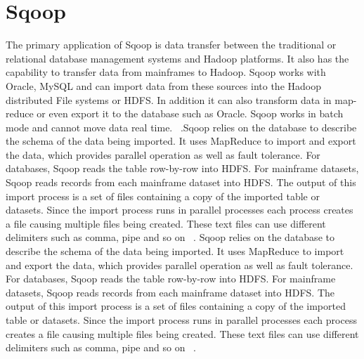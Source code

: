 \section{Sqoop}

The primary application of Sqoop is data transfer between the 
traditional or relational database management systems and 
Hadoop platforms. It also has the capability to transfer data 
from mainframes to Hadoop. Sqoop works with Oracle, MySQL and
can import data from these sources into the Hadoop distributed 
File systems or HDFS. In addition it can also transform data in 
map-reduce or even export it to the database such as Oracle.
Sqoop works in batch mode and cannot move data real time.
~\cite{hid-sp18-517-Sqoop}.Sqoop relies on the database to describe
the schema of the
data being imported. It uses MapReduce to import and export the data, 
which provides parallel operation as well as fault tolerance. 
For databases, Sqoop reads the table row-by-row into HDFS. 
For mainframe datasets, Sqoop reads records from each mainframe 
dataset into HDFS. The output of this import process is a set of 
files containing a copy of the imported table or datasets. Since 
the import process runs in parallel processes each process 
creates a file causing multiple files being created. These text 
files can use different delimiters such as comma, pipe and so on 
~\cite{hid-sp18-517-Sqoop}. Sqoop relies on the database to describe
the schema of the data being imported. It uses MapReduce to import and
export the data, 
which provides parallel operation as well as fault tolerance. 
For databases, Sqoop reads the table row-by-row into HDFS. 
For mainframe datasets, Sqoop reads records from each mainframe 
dataset into HDFS. The output of this import process is a set of 
files containing a copy of the imported table or datasets. Since 
the import process runs in parallel processes each process 
creates a file causing multiple files being created. These text 
files can use different delimiters such as comma, pipe and so on 
~\cite{hid-sp18-517-Sqoop}.


